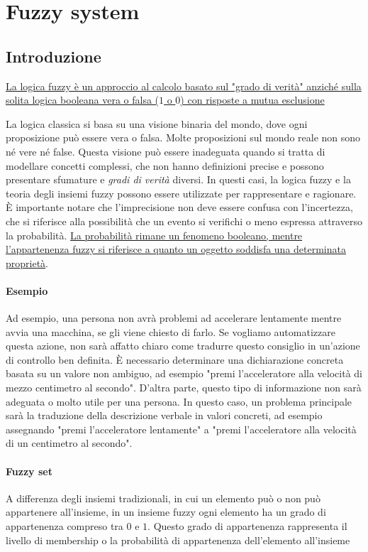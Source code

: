 \section{Fuzzy system}
\subsection{Introduzione}
\uline{La logica fuzzy è un approccio al calcolo basato sul "grado di verità" anziché sulla solita logica booleana vera o falsa ($1$ o $0$) con risposte a mutua esclusione}

La logica classica si basa su una visione binaria del mondo, dove ogni proposizione può essere vera o falsa. Molte proposizioni sul mondo reale non sono né vere né false. Questa visione può essere inadeguata quando si tratta di modellare concetti complessi, che non hanno definizioni precise e possono presentare sfumature e \textit{gradi di verità} diversi. In questi casi, la logica fuzzy e la teoria degli insiemi fuzzy possono essere utilizzate per rappresentare e ragionare. È importante notare che l'imprecisione non deve essere confusa con l'incertezza, che si riferisce alla possibilità che un evento si verifichi o meno espressa attraverso la probabilità. \uline{La probabilità rimane un fenomeno booleano, mentre l'appartenenza fuzzy si riferisce a quanto un oggetto soddisfa una determinata proprietà}.

\paragraph{Esempio}
Ad esempio, una persona non avrà problemi ad accelerare lentamente mentre avvia una macchina, se gli viene chiesto di farlo. Se vogliamo automatizzare questa azione, non sarà affatto chiaro come tradurre questo consiglio in un'azione di controllo ben definita. È necessario determinare una dichiarazione concreta basata su un valore non ambiguo, ad esempio "premi l'acceleratore alla velocità di mezzo centimetro al secondo". D'altra parte, questo tipo di informazione non sarà adeguata o molto utile per una persona. In questo caso, un problema principale sarà la traduzione della descrizione verbale in valori concreti, ad esempio assegnando "premi l'acceleratore lentamente" a "premi l'acceleratore alla velocità di un centimetro al secondo".

\paragraph{Fuzzy set}
A differenza degli insiemi tradizionali, in cui un elemento può o non può appartenere all'insieme, in un insieme fuzzy ogni elemento ha un grado di appartenenza compreso tra $0$ e $1$. Questo grado di appartenenza rappresenta il livello di membership o la probabilità di appartenenza dell'elemento all'insieme

